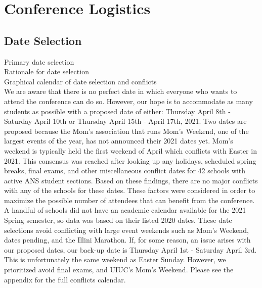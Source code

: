 
\section{Conference Logistics}

\subsection{Date Selection}
Primary date selection\\
Rationale for date selection\\
Graphical calendar of date selection and conflicts\\

We are aware that there is no perfect date in which everyone who wants to attend the conference can do so. However, our hope is to accommodate as many students as possible with a proposed date of either: Thursday April 8th - Saturday April 10th or Thursday April 15th - April 17th, 2021. Two dates are proposed because the Mom's association that runs Mom's Weekend, one of the largest events of the year, has not announced their 2021 dates yet. Mom's weekend is typically held the first weekend of April which conflicts with Easter in 2021. This consensus was reached after looking up any holidays, scheduled spring breaks, final exams, and other miscellaneous conflict dates for 42 schools with active ANS student sections. Based on these findings, there are no major conflicts with any of the schools for these dates. These factors were considered in order to maximize the possible number of attendees that can benefit from the conference. A handful of schools did not have an academic calendar available for the 2021 Spring semester, so data was based on their listed 2020 dates. These date selections avoid conflicting with large event weekends such as Mom's Weekend, dates pending, and the Illini Marathon. If, for some reason, an issue arises with our proposed dates, our back-up date is Thursday April 1st - Saturday April 3rd. This is unfortunately the same weekend as Easter Sunday. However, we prioritized avoid final exams, and UIUC’s Mom’s Weekend. Please see the appendix for the full conflicts calendar.


